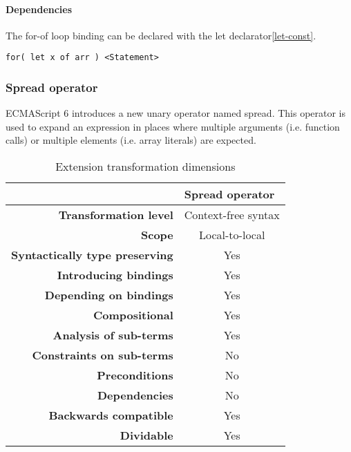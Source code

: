 \documentclass[10pt,a4paper]{article}
\begin{document}
\paragraph{Dependencies}
The for-of loop binding can be declared with the let declarator\ref{let-const}.

\begin{lstlisting}
for( let x of arr ) <Statement>
\end{lstlisting}


\subsubsection{Spread operator}
ECMAScript 6 introduces a new unary operator named spread\cite[12.3.6.1]{SpecJS}. This operator is used to expand an expression in places where multiple arguments (i.e. function calls) or multiple elements (i.e. array literals) are expected.

\begin{table}[H]
\centering
\caption{Extension transformation dimensions}
\label{spread-oeprator-table}
\begin{tabular}{@{}rc@{}}
\toprule
                                       & \multicolumn{1}{l}{\textbf{Spread operator}} \\ \midrule
\textbf{Transformation level}          & Context-free syntax                          \\
\textbf{Scope}                         & Local-to-local                               \\
\textbf{Syntactically type preserving} & Yes                                          \\
\textbf{Introducing bindings}          & Yes                                          \\%
\textbf{Depending on bindings}         & Yes                                           \\
\textbf{Compositional}                 & Yes                                          \\
\textbf{Analysis of sub-terms}          & Yes                                          \\
\textbf{Constraints on sub-terms}       & No                                           \\
\textbf{Preconditions}                 & No                                          \\
\textbf{Dependencies}                  & No                                           \\
\textbf{Backwards compatible}          & Yes                                          \\
\textbf{Dividable}                     & Yes                                           \\ \bottomrule
\end{tabular}
\end{table}
\end{document}
